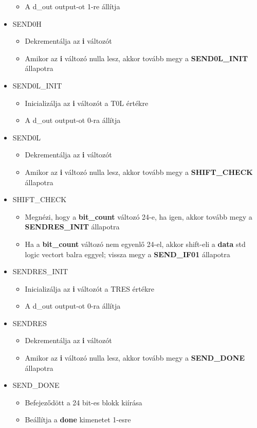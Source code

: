 \documentclass[10pt]{article} %
\begin{document}
\begin{itemize}
\begin{itemize}
	\item A d\_out output-ot 1-re állítja
	\end{itemize}
\item SEND0H
	\begin{itemize}
	\item Dekrementálja az \textbf{i} változót
	\item Amikor az \textbf{i} változó nulla lesz, akkor tovább megy a \textbf{SEND0L\_INIT} állapotra
	\end{itemize}
\item SEND0L\_INIT
	\begin{itemize}
	\item Inicializálja az \textbf{i} változót a T0L értékre
	\item A d\_out output-ot 0-ra állítja
	\end{itemize}
\item SEND0L
	\begin{itemize}
	\item Dekrementálja az \textbf{i} változót
	\item Amikor az \textbf{i} változó nulla lesz, akkor tovább megy a \textbf{SHIFT\_CHECK} állapotra
	\end{itemize}
\item SHIFT\_CHECK
	\begin{itemize}
	\item Megnézi, hogy a \textbf{bit\_count} változó 24-e, ha igen, akkor tovább megy a \textbf{SENDRES\_INIT} állapotra
	\item Ha a \textbf{bit\_count} változó nem egyenlő 24-el, akkor shift-eli a \textbf{data} std logic vectort balra eggyel; vissza megy a \textbf{SEND\_IF01} állapotra
	\end{itemize}
\item SENDRES\_INIT
	\begin{itemize}
	\item Inicializálja az \textbf{i} változót a TRES értékre
	\item A d\_out output-ot 0-ra állítja
	\end{itemize}
\item SENDRES
	\begin{itemize}
	\item Dekrementálja az \textbf{i} változót
	\item Amikor az \textbf{i} változó nulla lesz, akkor tovább megy a \textbf{SEND\_DONE} állapotra
	\end{itemize}
\item SEND\_DONE
	\begin{itemize}
	\item Befejeződött a 24 bit-es blokk kiírása
	\item Beállítja a \textbf{done} kimenetet 1-esre
	\end{itemize}
\end{itemize}
\end{document}
